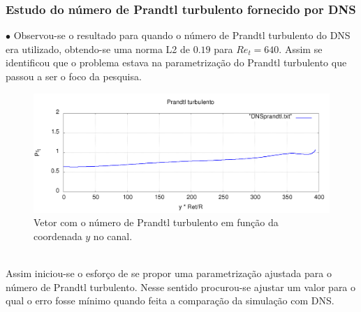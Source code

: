 \documentclass[xcolor=dvipsnames,10pt,aspectratio=169]{beamer}
\begin{document}
	
	
	
		
		\begin{frame}
		\frametitle{Estudo do número de Prandtl turbulento fornecido por DNS}
		\begin{minipage}[h!]{0.45\textwidth}
			$\bullet$ Observou-se o resultado para quando o número de Prandtl turbulento do DNS era utilizado, obtendo-se uma norma L2 de $0.19$ para $Re_t = 640$. Assim se identificou que o problema estava na parametrização do Prandtl turbulento que passou a ser o foco da pesquisa. 
		\end{minipage}\hfill
		\begin{minipage}[h!]{0.45\textwidth}
			\begin{figure}
				\centering
				\includegraphics[angle=0, scale=0.12]{perfisPrandtlturb_Ret_Pt}
				\caption{Vetor com o número de Prandtl turbulento em função da coordenada $ y $ no canal.}
			\end{figure}
		\end{minipage}	\\
		Assim iniciou-se o esforço de se propor uma parametrização ajustada para o número de Prandtl turbulento.
		Nesse sentido procurou-se ajustar um valor para o qual o erro fosse mínimo quando feita a comparação da simulação com DNS.
		\end{frame}
	
\end{document}
